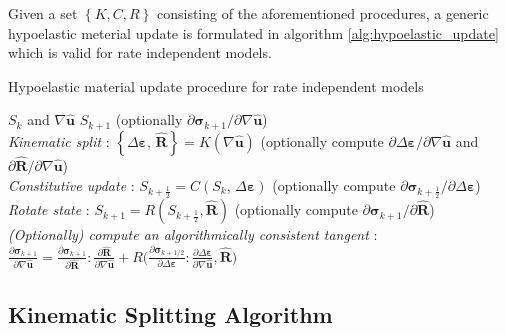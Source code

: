 Given a set $\left\{ K, C, R \right\}$ consisting of the aforementioned procedures, a generic hypoelastic meterial update is formulated in algorithm \ref{alg:hypoelastic_update} which is valid for rate independent models.
\begin{algorithm}
\begin{spacing}{1.3}
 \caption{Hypoelastic material update procedure for rate independent models}
 \label{alg:hypoelastic_update}
 \begin{algorithmic}[1]
 \renewcommand{\algorithmicrequire}{\textbf{Input:  }}
 \renewcommand{\algorithmicensure}{\textbf{Output:  }}
 \REQUIRE $S_k$ and $\nabla \hat{\mathbf{u}}$
 \ENSURE  $S_{k+1}$ (optionally $\partial \boldsymbol{\sigma}_{k+1} / \partial \nabla \hat{\mathbf{u}}$)
    \\ \textit{Kinematic split} :
    \STATE $\left\{ \Delta \boldsymbol{\varepsilon}, \, \hat{\mathbf{R}} \right\} = K(\nabla \hat{\mathbf{u}})$ (optionally compute $\partial \Delta \boldsymbol{\varepsilon} / \partial \nabla \hat{\mathbf{u}}$ and $\partial \hat{\mathbf{R}} / \partial \nabla \hat{\mathbf{u}}$)
    \\ \textit{Constitutive update} :
    \STATE $S_{k+\frac{1}{2}} = C (S_k, \, \Delta \boldsymbol{\varepsilon})$ (optionally compute $\partial \boldsymbol{\sigma}_{k+\frac{1}{2}} / \partial \Delta \boldsymbol{\varepsilon}$)
    \\ \textit{Rotate state} :
    \STATE $S_{k+1} = R (S_{k+\frac{1}{2}}, \hat{\mathbf{R}})$ (optionally compute $\partial \boldsymbol{\sigma}_{k+1} / \partial \hat{\mathbf{R}}$)
    \\ \textit{(Optionally) compute an algorithmically consistent tangent} :
    \STATE $\frac{\partial \boldsymbol{\sigma}_{k+1}}{\partial \nabla \hat{\mathbf{u}}} = \frac{\partial \boldsymbol{\sigma}_{k+1}}{\partial \hat{\mathbf{R}}} : \frac{\partial \hat{\mathbf{R}}}{\partial \nabla \hat{\mathbf{u}}} + R \big(\frac{\partial \boldsymbol{\sigma}_{k+1/2}}{\partial \Delta \boldsymbol{\varepsilon}} : \frac{\partial \Delta \boldsymbol{\varepsilon}}{\partial \nabla \hat{\mathbf{u}}}, \hat{\mathbf{R}}\big)$
 \end{algorithmic}
 \end{spacing}
 \end{algorithm}
 
\subsection{Kinematic Splitting Algorithm}

